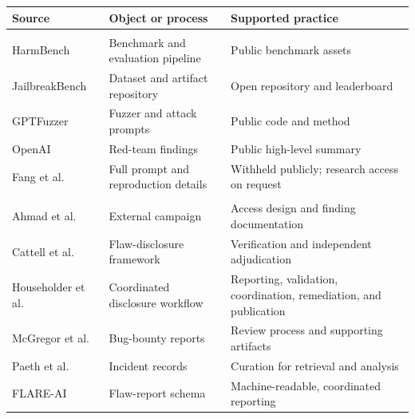 \documentclass[review]{fcs}
\let\fcsOriginalCite\cite
\renewcommand{\cite}[1]{\allowbreak\fcsOriginalCite{#1}}
\begin{document}
\begingroup
\noindent\begin{minipage}{\columnwidth}
\centering
\captionsetup{font=small,hypcap=false}
\label{tab:redteam_disclosure}
\scriptsize
\setlength{\tabcolsep}{1.2pt}
\renewcommand{\arraystretch}{1.04}
\begin{tabular}{@{}>{\raggedright\arraybackslash}p{1.02in}>{\raggedright\arraybackslash}p{1.08in}>{\raggedright\arraybackslash}p{1.15in}@{}}
\toprule
Source & Object or process & Supported practice \\
\midrule
\rowcolor{gray!12}
\multicolumn{3}{@{}l@{}}{Artifact handling}\\[-1.5pt]
HarmBench~\cite{mazeika2024harmbench} & Benchmark and evaluation pipeline & Public benchmark assets \\
JailbreakBench~\cite{chao2024jailbreakbench} & Dataset and artifact repository & Open repository and leaderboard \\
GPTFuzzer~\cite{yu2023gptfuzzer} & Fuzzer and attack prompts & Public code and method \\
OpenAI~\cite{openai2023gpt4systemcard} & Red-team findings & Public high-level summary \\
Fang et al.~\cite{fang2024llmagentsautonomouslyhack} & Full prompt and reproduction details & Withheld publicly; research access on request \\
\addlinespace[1pt]
\rowcolor{gray!12}
\multicolumn{3}{@{}l@{}}{Finding accountability}\\[-1.5pt]
Ahmad et al.~\cite{ahmad2025externalredteaming} & External campaign & Access design and finding documentation \\
Cattell et al.~\cite{cattell2024coordinatedflaw} & Flaw-disclosure framework & Verification and independent adjudication \\
Householder et al.~\cite{householder2024lessons} & Coordinated disclosure workflow & Reporting, validation, coordination, remediation, and publication \\
McGregor et al.~\cite{mcgregor2025toerr} & Bug-bounty reports & Review process and supporting artifacts \\
Paeth et al.~\cite{paeth2025lessons} & Incident records & Curation for retrieval and analysis \\
FLARE-AI~\cite{longpre2026flareai} & Flaw-report schema & Machine-readable, coordinated reporting \\
\bottomrule
\end{tabular}
\end{minipage}
\endgroup
\end{document}
